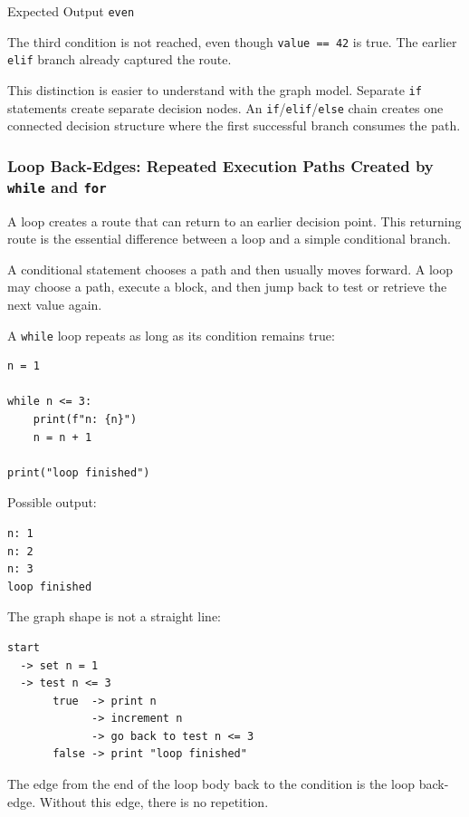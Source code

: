 \begin{iobox}{Expected Output}
\texttt{even} \\
\end{iobox}


The third condition is not reached, even though \texttt{value == 42} is true. The earlier \texttt{elif} branch already captured the route.

This distinction is easier to understand with the graph model. Separate \texttt{if} statements create separate decision nodes. An \texttt{if}/\texttt{elif}/\texttt{else} chain creates one connected decision structure where the first successful branch consumes the path.

\subsubsection{Loop Back-Edges: Repeated Execution Paths Created by \texttt{while} and \texttt{for}}

A loop creates a route that can return to an earlier decision point. This returning route is the essential difference between a loop and a simple conditional branch.

A conditional statement chooses a path and then usually moves forward. A loop may choose a path, execute a block, and then jump back to test or retrieve the next value again.

A \texttt{while} loop repeats as long as its condition remains true:

\begin{verbatim}
n = 1

while n <= 3:
    print(f"n: {n}")
    n = n + 1

print("loop finished")
\end{verbatim}

Possible output:

\begin{verbatim}
n: 1
n: 2
n: 3
loop finished
\end{verbatim}

The graph shape is not a straight line:

\begin{verbatim}
start
  -> set n = 1
  -> test n <= 3
       true  -> print n
             -> increment n
             -> go back to test n <= 3
       false -> print "loop finished"
\end{verbatim}

The edge from the end of the loop body back to the condition is the loop back-edge. Without this edge, there is no repetition.

